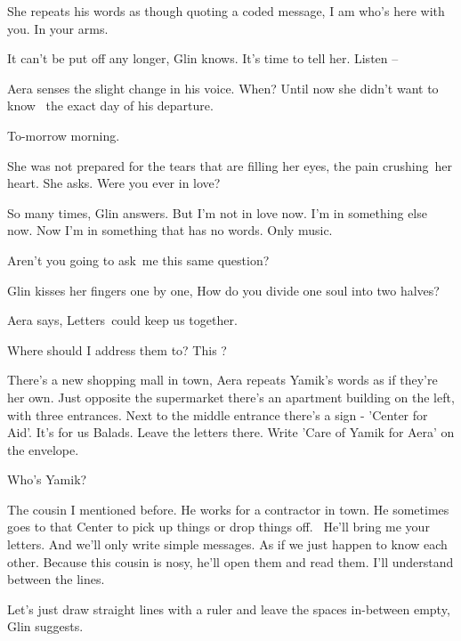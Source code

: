 \documentclass[letterpaper]{article}
\begin{document}
She repeats his words as though quoting a coded message, {\textquotedbl}I am who's here with you. In your
arms.{\textquotedbl}

It can't be put off any longer, Glin knows. It's time to tell her. {\textquotedbl}Listen --{\textquotedbl} 

Aera senses the slight change in his voice. {\textquotedbl}When?{\textquotedbl} Until now she didn't want to know \ the
exact day of his departure.

{\textquotedbl}To-morrow morning.{\textquotedbl} 

She was not prepared for the tears that are filling her eyes, the pain crushing~her heart. She asks. {\textquotedbl}Were
you ever in love?{\textquotedbl} 

{\textquotedbl}So many times,{\textquotedbl} Glin answers. {\textquotedbl}But I'm not in love now. I'm in something else
now. Now I'm in something that has no words. Only music.{\textquotedbl} ~

{\textquotedbl}Aren't you going to ask~me this same question?{\textquotedbl} 

Glin kisses her fingers one by one, {\textquotedbl}How do you divide one soul into two halves?{\textquotedbl}

Aera says, {\textquotedbl}Letters~could keep us together.{\textquotedbl} 

{\textquotedbl}Where should I address them to? This ?{\textquotedbl} 

{\textquotedbl}There's a new shopping mall in town,{\textquotedbl} Aera repeats Yamik's words as if they're her own.
{\textquotedbl}Just opposite the supermarket there's an apartment building on the left, with three entrances. Next to
the middle entrance there's a sign - {}'Center for Aid'. It's for us Balads. Leave the letters there. Write 'Care of
Yamik for Aera' on the envelope.{\textquotedbl} 

{\textquotedbl}Who's Yamik?{\textquotedbl} 

{\textquotedbl}The cousin I mentioned before. He works for a contractor in town. He sometimes goes to that Center to
pick up things or drop things off.~ He'll bring me your letters. And we'll only write simple messages. As if we just
happen to know each other. Because this cousin is nosy, he'll open them and read them. I'll understand between the
lines.{\textquotedbl} 

{\textquotedbl}Let's just draw straight lines with a ruler and leave the spaces in-between empty,{\textquotedbl} Glin
suggests. 
\end{document}
